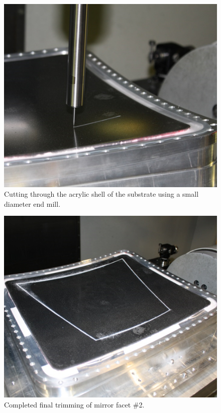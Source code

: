 \begin{figure}[ht]
    \centering
    \includegraphics[width=1.0\linewidth]{images/Trimming_1}
    \caption{Cutting through the acrylic shell of the substrate using a small diameter end mill.}
    \label{fig:Trimming_1}
\end{figure}


\begin{figure}[ht]
    \centering
    \includegraphics[width=1.0\linewidth]{images/Trimming_2}
    \caption{Completed final trimming of mirror facet \#2.}
    \label{fig:Trimming_2}
\end{figure}

